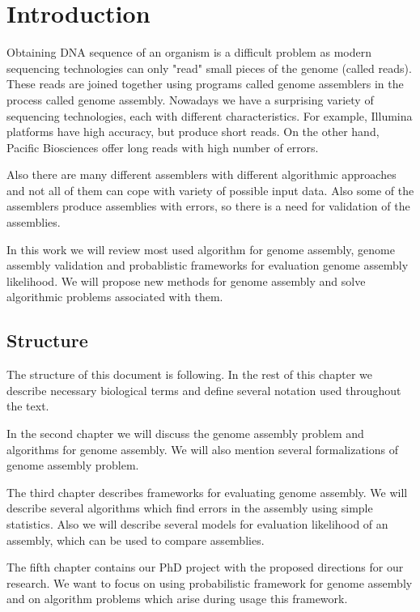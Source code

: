 \chapter{Introduction}

Obtaining DNA sequence of an organism is a difficult problem
as modern sequencing technologies can only "read" small pieces
of the genome (called reads). 
These reads are joined together using programs called genome assemblers
in the process called genome assembly.
Nowadays we have a surprising variety of sequencing technologies,
each with different characteristics. For example,
Illumina platforms have high accuracy, but produce short reads. 
On the other hand, Pacific Biosciences offer long reads with high number
of errors. 

Also there are many different assemblers with different algorithmic
approaches and not all of them can cope with variety of possible input data.
Also some of the assemblers produce assemblies with errors, so
there is a need for validation of the assemblies.

In this work we will review most used algorithm for genome assembly,
genome assembly validation and probablistic frameworks for evaluation
genome assembly likelihood. We will propose new methods
for genome assembly and solve algorithmic problems associated with them.

\section{Structure}

The structure of this document is following. In the rest of this chapter we
describe necessary biological terms and define several notation used throughout
the text.

In the second chapter we will discuss the genome assembly
problem and algorithms for genome assembly.
We will also mention several formalizations of genome assembly problem.

The third chapter describes frameworks for evaluating genome assembly.
We will describe several algorithms which find errors in the assembly
using simple statistics. Also we will describe several models
for evaluation likelihood of an assembly, which can be used
to compare assemblies.

The fifth chapter contains our PhD project with the proposed directions for our
research. We want to focus on using probabilistic framework 
for genome assembly and on algorithm problems which arise during usage this framework.

